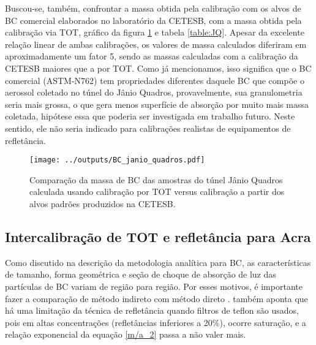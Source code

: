 Buscou-se, também, confrontar a massa obtida pela calibração com os  
alvos de BC comercial elaborados no laboratório da CETESB, com a massa 
obtida pela calibração via TOT, gráfico da figura \ref{fig:JQ} e tabela
\ref{table:JQ}. Apesar da excelente relação linear de ambas calibrações, os 
valores de massa calculados diferiram em aproximadamente um fator 5, sendo as 
massas calculadas com a calibração da CETESB maiores que a por TOT.  
Como já mencionamos, isso significa que o BC comercial (ASTM-N762) tem 
propriedades diferentes daquele BC que compõe o aerossol coletado no túnel do 
Jânio Quadros, provavelmente, sua granulometria seria mais grossa, o que gera 
menos superfície de absorção por muito mais massa coletada, hipótese essa que
poderia ser investigada em trabalho futuro. 
Neste sentido, ele 
não seria indicado para calibrações realistas de equipamentos de refletância. 

\begin{figure}[H]
  \centering
  \begin{minipage}[b]{0.5\linewidth}
    \texttt{[image: ../outputs/BC\_janio\_quadros.pdf]}
    \caption{Comparação da massa de BC das amostras do túnel Jânio Quadros 
             calculada usando calibração por TOT versus calibração a partir dos 
             alvos padrões produzidos na CETESB. \label{fig:JQ}}
  \end{minipage}
  \hspace{0.5cm}
  \begin{minipage}[b]{0.45\linewidth}
    \begin{small}
      
    \end{small}

  \end{minipage}
\end{figure}

\newpage
\subsection{Intercalibração de TOT e refletância para Acra}

Como discutido na descrição da metodologia analítica para BC, as características
de tamanho, forma geométrica e seção de choque de absorção de luz das 
partículas de BC variam de região para região.
Por esses motivos, é importante fazer a comparação de método indireto com método
direto \citep{quincey2007}. \citet{taha2007} também aponta que há uma limitação 
da técnica de refletância quando filtros de teflon são usados, pois em altas 
concentrações (refletâncias inferiores a 20\%), ocorre saturação, e a 
relação exponencial da equação \ref{m/a_2} passa a não valer 
mais. 

